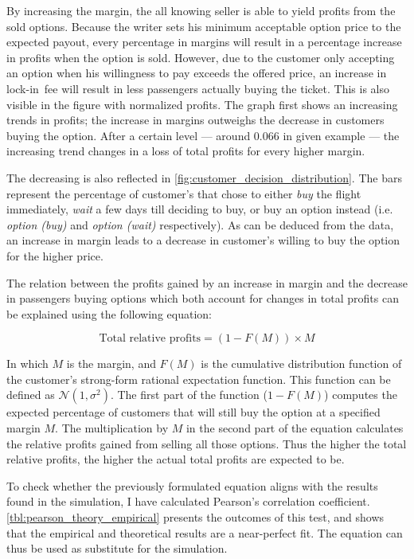
By increasing the margin, the all knowing seller is able to yield profits from the sold options. Because the writer sets his minimum acceptable option price to the expected payout, every percentage in margins will result in a percentage increase in profits when the option is sold. However, due to the customer only accepting an option when his willingness to pay exceeds the offered price, an increase in lock-in~fee will result in less passengers actually buying the ticket. This is also visible in the figure with normalized profits. The graph first shows an increasing trends in profits; the increase in margins outweighs the decrease in customers buying the option. After a certain level --- around 0.066 in given example --- the increasing trend changes in a loss of total profits for every higher margin.

The decreasing is also reflected in \autoref{fig:customer_decision_distribution}. The bars represent the percentage of customer's that chose to either \emph{buy} the flight immediately, \emph{wait} a few days till deciding to buy, or buy an option instead (i.e. \emph{option (buy)} and \emph{option (wait)} respectively). As can be deduced from the data, an increase in margin leads to a decrease in customer's willing to buy the option for the higher price.


The relation between the profits gained by an increase in margin and the decrease in passengers buying options which both account for changes in total profits can be explained using the following equation:

$$ \mbox{Total relative profits} = (1 - F(M)) \times M $$

In which $M$ is the margin, and $F(M)$ is the cumulative distribution function of the customer's strong-form rational expectation function. This function can be defined as $\mathcal{N}(1, \sigma^2)$. The first part of the function ($1 - F(M)$) computes the expected percentage of customers that will still buy the option at a specified margin $M$. The multiplication by $M$ in the second part of the equation calculates the relative profits gained from selling all those options. Thus the higher the total relative profits, the higher the actual total profits are expected to be.

To check whether the previously formulated equation aligns with the results found in the simulation, I have calculated Pearson's correlation coefficient. \autoref{tbl:pearson_theory_empirical} presents the outcomes of this test, and shows that the empirical and theoretical results are a near-perfect fit. The equation can thus be used as substitute for the simulation.

